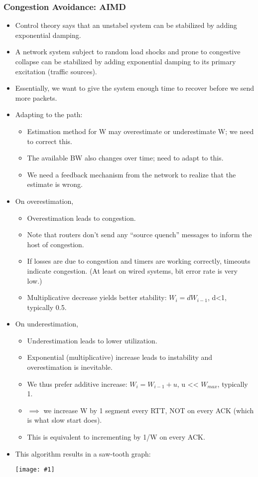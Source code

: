 \documentclass{report}
\makeatletter
\def\maxwidth#1{\ifdim\Gin@nat@width>#1 #1\else\Gin@nat@width\fi}
\newcommand{\mygraphic}[1]{
\begin{center}
    \texttt{[image: \#1]}
\end{center}
}
\makeatother
\begin{document}
\subsubsection{Congestion Avoidance: AIMD}
\begin{itemize}
\item Control theory says that an unstabel system can be stabilized by adding exponential damping.
\item A network system subject to random load shocks and prone to congestive collapse can be stabilized by adding exponential damping to its primary excitation (traffic sources).
\item Essentially, we want to give the system enough time to recover before we send more packets.
\item Adapting to the path:
\begin{itemize}
\item Estimation method for W may overestimate or underestimate W; we need to correct this.
\item The available BW also changes over time; need to adapt to this.
\item We need a feedback mechanism from the network to realize that the estimate is wrong.
\end{itemize}
\item On overestimation,
\begin{itemize}
\item Overestimation leads to congestion.
\item Note that routers don't send any ``source quench'' messages to inform the host of congestion.
\item If losses are due to congestion and timers are working correctly, timeouts indicate congestion. (At least on wired systems, bit error rate is very low.)
\item Multiplicative decrease yields better stability: $W_i = dW_{i-1}$, d<1, typically 0.5.
\end{itemize}
\item On underestimation,
\begin{itemize}
\item Underestimation leads to lower utilization.
\item Exponential (multiplicative) increase leads to instability and overestimation is inevitable.
\item We thus prefer additive increase: $W_i = W_{i-1} + u$, u << $W_{max}$, typically 1.
\item $\implies$ we increase W by 1 segment every RTT, NOT on every ACK (which is what slow start does).
\item This is equivalent to incrementing by 1/W on every ACK.
\end{itemize}
\item This algorithm results in a saw-tooth graph:
\mygraphic{rsrc/CAgraph.png}
\end{itemize}
\end{document}
